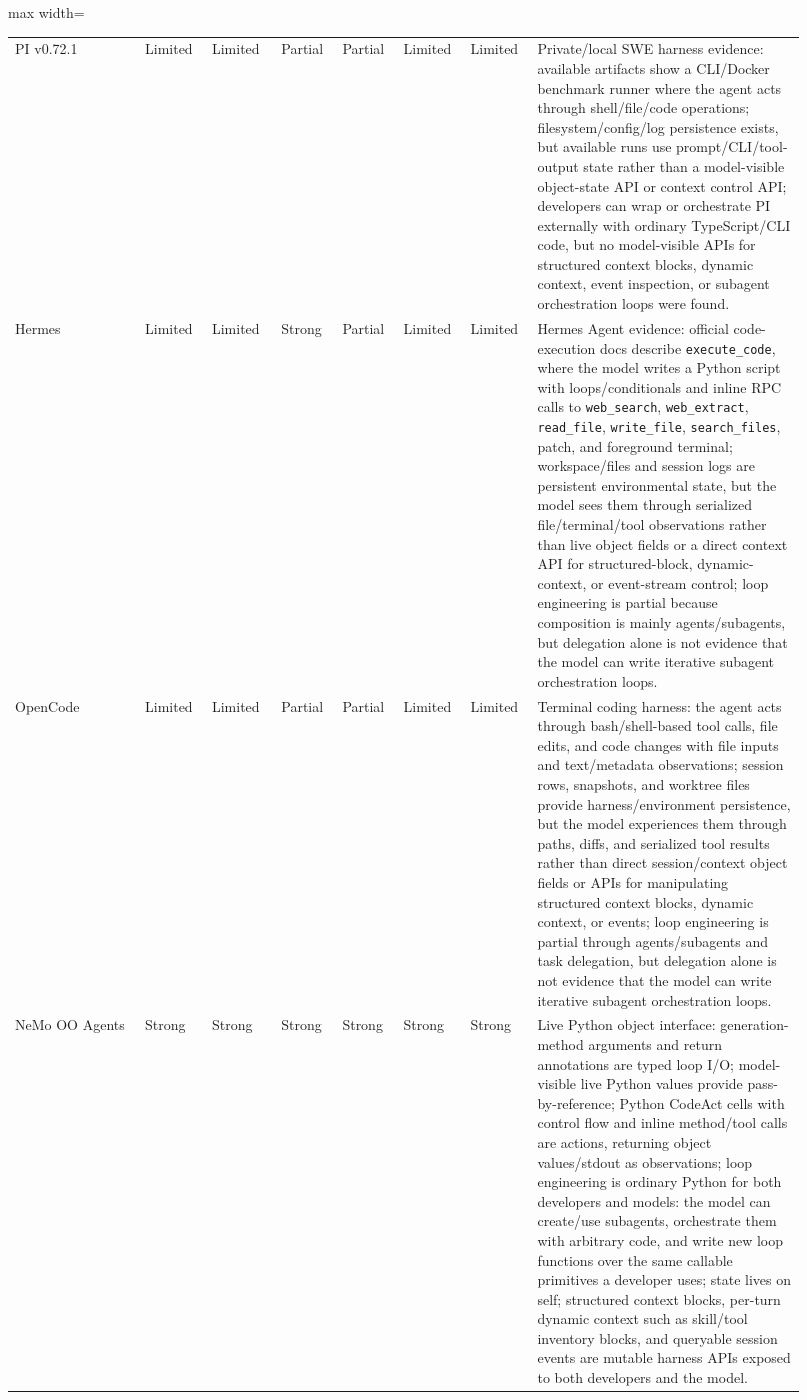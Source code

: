 \documentclass[11pt, logo, onecolumn, copyright, colorlinks=true, allcolors=blue]{nvidiatechreport}
\begin{document}
\begin{landscape}
\begin{table}[p]
\begin{adjustbox}{max width=\linewidth}
\begin{tabular}{p{0.15\linewidth}p{0.075\linewidth}p{0.085\linewidth}p{0.075\linewidth}p{0.075\linewidth}p{0.075\linewidth}p{0.075\linewidth}p{0.31\linewidth}}
PI v0.72.1 & Limited & Limited & Partial & Partial & Limited & Limited & Private/local SWE harness evidence: available artifacts show a CLI/Docker benchmark runner where the agent acts through shell/file/code operations; filesystem/config/log persistence exists, but available runs use prompt/CLI/tool-output state rather than a model-visible object-state API or context control API; developers can wrap or orchestrate PI externally with ordinary TypeScript/CLI code, but no model-visible APIs for structured context blocks, dynamic context, event inspection, or subagent orchestration loops were found. \\
Hermes & Limited & Limited & Strong & Partial & Limited & Limited & Hermes Agent evidence: official code-execution docs describe \texttt{execute\_code}, where the model writes a Python script with loops/conditionals and inline RPC calls to \texttt{web\_search}, \texttt{web\_extract}, \texttt{read\_file}, \texttt{write\_file}, \texttt{search\_files}, patch, and foreground terminal; workspace/files and session logs are persistent environmental state, but the model sees them through serialized file/terminal/tool observations rather than live object fields or a direct context API for structured-block, dynamic-context, or event-stream control; loop engineering is partial because composition is mainly agents/subagents, but delegation alone is not evidence that the model can write iterative subagent orchestration loops. \\
OpenCode & Limited & Limited & Partial & Partial & Limited & Limited & Terminal coding harness: the agent acts through bash/shell-based tool calls, file edits, and code changes with file inputs and text/metadata observations; session rows, snapshots, and worktree files provide harness/environment persistence, but the model experiences them through paths, diffs, and serialized tool results rather than direct session/context object fields or APIs for manipulating structured context blocks, dynamic context, or events; loop engineering is partial through agents/subagents and task delegation, but delegation alone is not evidence that the model can write iterative subagent orchestration loops. \\
NeMo OO Agents & Strong & Strong & Strong & Strong & Strong & Strong & Live Python object interface: generation-method arguments and return annotations are typed loop I/O; model-visible live Python values provide pass-by-reference; Python CodeAct cells with control flow and inline method/tool calls are actions, returning object values/stdout as observations; loop engineering is ordinary Python for both developers and models: the model can create/use subagents, orchestrate them with arbitrary code, and write new loop functions over the same callable primitives a developer uses; state lives on self; structured context blocks, per-turn dynamic context such as skill/tool inventory blocks, and queryable session events are mutable harness APIs exposed to both developers and the model. \\

\end{tabular}
\end{adjustbox}
\end{table}
\end{landscape}
\end{document}
